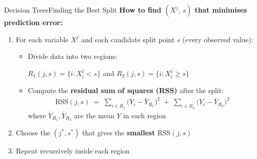 \documentclass[dvipsnames,hyperref={pdfpagelabels=false}]{beamer}
\begin{document}
\begin{frame}{Decision Trees}{Finding the Best Split}
\textbf{How to find $(X^j,\, s)$ that minimises prediction error:}
\vspace{0.2cm}
\begin{enumerate}
  \item For each variable $X^j$ and each candidate split point $s$ (every observed value):
  \vspace{0.2cm}

  \begin{itemize}
    \item Divide data into two regions:
 

      $R_1(j,s) = \{i : X^j_i < s\}$ and $R_2(j,s) = \{i : X^j_i \geq s\}$
         \vspace{0.2cm}
    \item Compute the \textbf{residual sum of squares (RSS)} after the split:
    \begin{align*}
      \text{RSS}(j,s) \;=\;
      \sum_{i\in R_1}\!\bigl(Y_i - \bar{Y}_{R_1}\bigr)^2
      \;+\;
      \sum_{i\in R_2}\!\bigl(Y_i - \bar{Y}_{R_2}\bigr)^2
    \end{align*}
    where $\bar{Y}_{R_1},\bar{Y}_{R_2}$ are the mean $Y$ in each region\
    \vspace{0.2cm}

  \end{itemize}
  \item Choose the $(j^*, s^*)$ that gives the \textbf{smallest} $\text{RSS}(j,s)$
  \vspace{0.2cm}
  \item Repeat recursively inside each region
\end{enumerate}



\end{frame}
\end{document}
